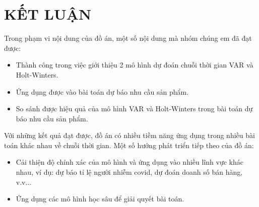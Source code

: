 \chapter{KẾT LUẬN}
Trong phạm vi nội dung của đồ án, một số nội dung mà nhóm chúng em đã đạt được:
\begin{itemize}
    \item Thành công trong việc giới thiệu 2 mô hình dự đoán chuỗi thời gian VAR và Holt-Winters. 
    \item Ứng dụng được vào bài toán dự báo nhu cầu sản phẩm.
    \item So sánh được hiệu quả của mô hình VAR và Holt-Winters trong bài toán dự báo nhu cầu sản phẩm.
\end{itemize}
Với những kết quả đạt được, đồ án có nhiều tiềm năng ứng dụng trong nhiều bài toán khác nhau về chuỗi thời gian. Một số hướng phát triển tiếp theo của đồ án:
\begin{itemize}
    \item Cải thiện độ chính xác của mô hình và ứng dụng vào nhiều lĩnh vực khác nhau, ví dụ: dự báo tỉ lệ người nhiễm covid, dự đoán doanh số bán hàng, v.v...
    \item Ứng dụng các mô hình học sâu để giải quyết bài toán.
\end{itemize}

